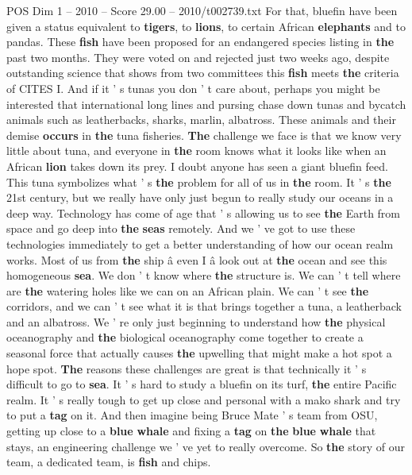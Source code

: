 \begin{textsample}{POS Dim 1 – 2010 – Score 29.00 – 2010/t002739.txt}
For that, bluefin have been given a status equivalent to \textbf{tigers}, to \textbf{lions}, to certain African \textbf{elephants} and to pandas.
These \textbf{fish} have been proposed for an endangered species listing in \textbf{the} past two months.
They were voted on and rejected just two weeks ago, despite outstanding science that shows from two committees this \textbf{fish} meets \textbf{the} criteria of CITES I.
And if it ' s tunas you don ' t care about, perhaps you might be interested that international long lines and pursing chase down tunas and bycatch animals such as leatherbacks, sharks, marlin, albatross.
These animals and their demise \textbf{occurs} in \textbf{the} tuna fisheries. \textbf{The} challenge we face is that we know very little about tuna, and everyone in \textbf{the} room knows what it looks like when an African \textbf{lion} takes down its prey.
I doubt anyone has seen a giant bluefin feed.
This tuna symbolizes what ' s \textbf{the} problem for all of us in \textbf{the} room.
It ' s \textbf{the} 21st century, but we really have only just begun to really study our oceans in a deep way.
Technology has come of age that ' s allowing us to see \textbf{the} Earth from space and go deep into \textbf{the} \textbf{seas} remotely.
And we ' ve got to use these technologies immediately to get a better understanding of how our ocean realm works.
Most of us from \textbf{the} ship â even I â look out at \textbf{the} ocean and see this homogeneous \textbf{sea}.
We don ' t know where \textbf{the} structure is.
We can ' t tell where are \textbf{the} watering holes like we can on an African plain.
We can ' t see \textbf{the} corridors, and we can ' t see what it is that brings together a tuna, a leatherback and an albatross.
We ' re only just beginning to understand how \textbf{the} physical oceanography and \textbf{the} biological oceanography come together to create a seasonal force that actually causes \textbf{the} upwelling that might make a hot spot a hope spot. \textbf{The} reasons these challenges are great is that technically it ' s difficult to go to \textbf{sea}.
It ' s hard to study a bluefin on its turf, \textbf{the} entire Pacific realm.
It ' s really tough to get up close and personal with a mako shark and try to put a \textbf{tag} on it.
And then imagine being Bruce Mate ' s team from OSU, getting up close to a \textbf{blue} \textbf{whale} and fixing a \textbf{tag} on \textbf{the} \textbf{blue} \textbf{whale} that stays, an engineering challenge we ' ve yet to really overcome.
So \textbf{the} story of our team, a dedicated team, is \textbf{fish} and chips.

\end{textsample}
